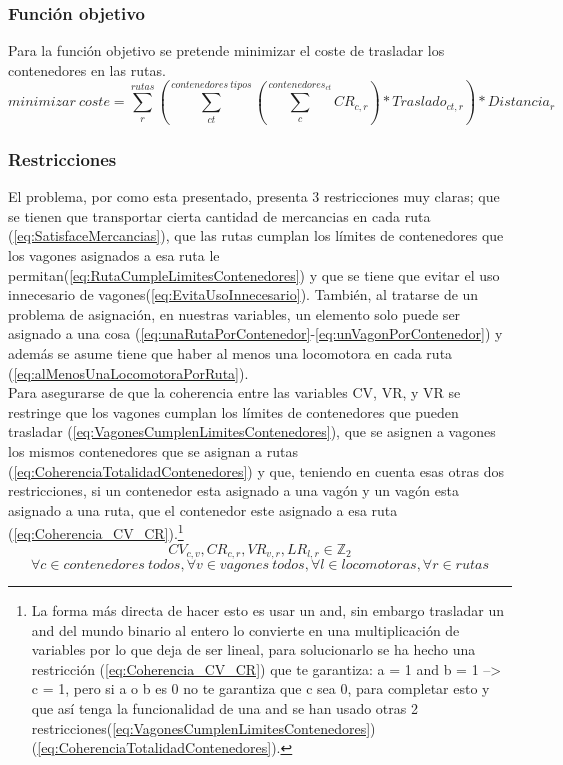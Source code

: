 \documentclass[11pt,spanish]{article}
\begin{document}
			\subsubsection{Función objetivo}
			Para la función objetivo se pretende minimizar el coste de trasladar los contenedores en las rutas.
			$$
			minimizar\ coste = \sum_r^{rutas} \left( \sum_{ct}^{contenedores\ tipos} \left( \sum_c^{contenedores_{ct}} CR_{c,r} \right) * Traslado_{ct,r} \right) * Distancia_r
			$$
			\subsubsection{Restricciones}
			El problema, por como esta presentado, presenta 3 restricciones muy claras; que se tienen que transportar cierta cantidad de mercancias en cada ruta (\ref{eq:SatisfaceMercancias}), que las rutas cumplan los límites de contenedores que los vagones asignados a esa ruta le permitan(\ref{eq:RutaCumpleLimitesContenedores}) y que se tiene que evitar el uso innecesario de vagones(\ref{eq:EvitaUsoInnecesario}). También, al tratarse de un problema de asignación, en nuestras variables, un elemento solo puede ser asignado a una cosa (\ref{eq:unaRutaPorContenedor}-\ref{eq:unVagonPorContenedor}) y además se asume tiene que haber al menos una locomotora en cada ruta (\ref{eq:alMenosUnaLocomotoraPorRuta}).\\
			Para asegurarse de que la coherencia entre las variables CV, VR, y VR se restringe que los vagones cumplan los límites de contenedores que pueden trasladar (\ref{eq:VagonesCumplenLimitesContenedores}), que se asignen a vagones los mismos contenedores que se asignan a rutas (\ref{eq:CoherenciaTotalidadContenedores}) y que, teniendo en cuenta esas otras dos restricciones, si un contenedor esta asignado a una vagón y un vagón esta asignado a una ruta, que el contenedor este asignado a esa ruta (\ref{eq:Coherencia_CV_CR}).\footnote{La forma más directa de hacer esto es usar un and, sin embargo trasladar un and del mundo binario al entero lo convierte en una multiplicación de variables por lo que deja de ser lineal, para solucionarlo se ha hecho una restricción (\ref{eq:Coherencia_CV_CR}) que te garantiza: a = 1 and b = 1 --> c = 1, pero si a o b es 0 no te garantiza que c sea 0, para completar esto y que así tenga la funcionalidad de una and se han usado otras 2 restricciones(\ref{eq:VagonesCumplenLimitesContenedores})(\ref{eq:CoherenciaTotalidadContenedores}).}
			$$
				CV_{c,v},CR_{c,r},VR_{v,r},LR_{l,r} \in \mathbb{Z}_2
			$$
			\begin{equation}
				\forall c \in contenedores\ todos, \forall v \in vagones\ todos, \forall l \in locomotoras, \forall r \in rutas	
			\end{equation}
\end{document}
